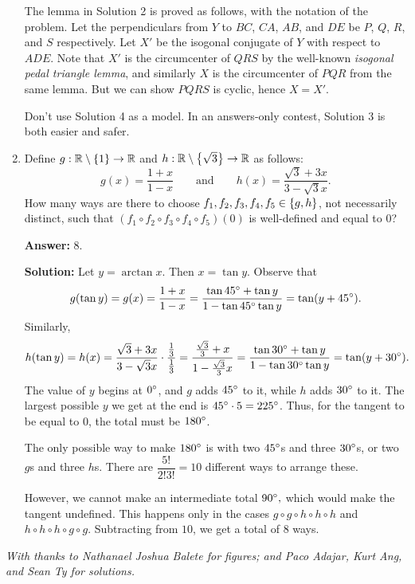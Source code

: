 \documentclass[11pt,paper=letter]{scrartcl}
\begin{document}
\begin{enumerate}[left=0pt]
The lemma in Solution 2 is proved as follows, with the notation of the problem. Let the perpendiculars from $Y$ to $BC$, $CA$, $AB$, and $DE$ be $P$, $Q$, $R$, and $S$ respectively. Let $X'$ be the isogonal conjugate of $Y$ with respect to $ADE$. Note that $X'$ is the circumcenter of $QRS$ by the well-known \emph{isogonal pedal triangle lemma}, and similarly $X$ is the circumcenter of $PQR$ from the same lemma. But we can show $PQRS$ is cyclic, hence $X = X'$.

Don't use Solution 4 as a model. In an answers-only contest, Solution 3 is both easier and safer.

\item Define $g : \mathbb R \setminus \left\{ 1 \right\} \to \mathbb R$ and $h : \mathbb R \setminus \left\{ \sqrt3 \right\} \to \mathbb R$ as follows: $$g(x) = \frac{1+x}{1-x} \qquad \text{and} \qquad h(x) = \frac{\sqrt3 + 3x}{3 - \sqrt3x}.$$ How many ways are there to choose $f_1, f_2, f_3, f_4, f_5 \in \left\{ g, h \right\}$, not necessarily distinct, such that $(f_1 \circ f_2 \circ f_3 \circ f_4 \circ f_5)(0)$ is well-defined and equal to $0$?

\textbf{Answer:} $\boxed{8}$.

\textbf{Solution:} Let $y = \arctan x$. Then $x = \tan y$. Observe that $$g(\tan y) = g(x) = \frac{1+x}{1-x} = \frac{\tan 45^\circ + \tan y}{1 - \tan 45^\circ \tan y} = \tan(y+45^\circ).$$ Similarly, $$h(\tan y) = h(x) = \frac{\sqrt3 + 3x}{3 - \sqrt3x} \cdot \frac{\frac13}{\frac13} = \frac{\frac{\sqrt3}3 + x}{1 - \frac{\sqrt3}3x} = \frac{\tan30^\circ + \tan y}{1 - \tan30^\circ\tan y} = \tan(y+30^\circ).$$ The value of $y$ begins at $0^\circ$, and $g$ adds $45^\circ$ to it, while $h$ adds $30^\circ$ to it. The largest possible $y$ we get at the end is $45^\circ \cdot 5 = 225^\circ$. Thus, for the tangent to be equal to $0$, the total must be $180^\circ$.

The only possible way to make $180^\circ$ is with two $45^\circ$s and three $30^\circ$s, or two $g$s and three $h$s. There are $\dfrac{5!}{2!3!} = 10$ different ways to arrange these.

However, we cannot make an intermediate total $90^\circ,$ which would make the tangent undefined. This happens only in the cases $g \circ g \circ h \circ h \circ h$ and $h \circ h \circ h \circ g \circ g$. Subtracting from $10$, we get a total of $8$ ways.

\end{enumerate}

\emph{With thanks to Nathanael Joshua Balete for figures; and Paco Adajar, Kurt Ang, and Sean Ty for solutions.}
\end{document}
